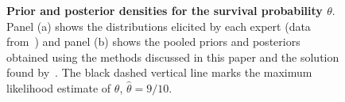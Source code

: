 \documentclass[a4paper, notitlepage, 10pt]{article}
\begin{document}
\begin{figure}[!ht]
\begin{center}
\end{center}
\caption{\textbf{Prior and posterior densities for the survival probability $\theta$}.
Panel (a) shows the distributions elicited by each expert (data from~\cite{savchuk1994}) and panel (b) shows the pooled priors and posteriors obtained using the methods discussed in this paper and the solution found by~\cite{rufo2012B}.
The black dashed vertical line marks the maximum likelihood estimate of $\theta$, $\hat{\theta}= 9/10$.
}
\label{fig:priors_posteriors_Savchuk}
\end{figure}
\end{document}
